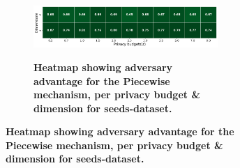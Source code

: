 \begin{figure}[H]
\begin{subfigure}[b]{0.85\textwidth}
            \begin{subfigure}[c]{1\textwidth}
                  \caption{\textbf{Heatmap showing adversary advantage for the Piecewise mechanism, per privacy budget \& dimension for seeds-dataset.}}
                  \includegraphics[width=1\textwidth]{Results/kd-laplace/piecewise/skewed-dataset/shokri_mi_adv.png}
                  \label{fig:privacy_skewed-dataset_adversial_advantage_piecewise}
            \end{subfigure}
      \end{subfigure}
      \hfill %
      \begin{subfigure}[b]{0.075\textwidth}

\end{subfigure}
\end{figure}
